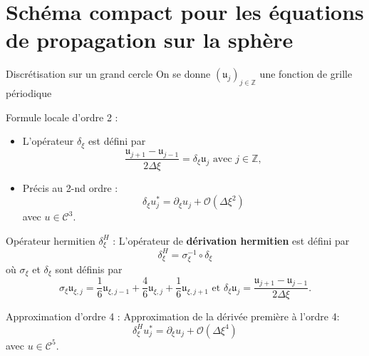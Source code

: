 \documentclass[11pt]{beamer}
\begin{document}
\section{Schéma compact pour les équations de propagation sur la sphère}
\begin{frame}{Discrétisation sur un grand cercle}
On se donne $(\mathfrak{u}_j)_{j\in \mathbb{Z}}$ une fonction de grille périodique
\begin{figure}[htbp]
\begin{center}
\end{center}
\end{figure}

\begin{block}{Formule locale d'ordre 2 :}
\begin{itemize}
\item L'opérateur $\delta_{\xi}$ est défini par
$$
\dfrac{\mathfrak{u}_{j+1}-\mathfrak{u}_{j-1}}{2 \Delta \xi} = \delta_{\xi} \mathfrak{u}_j \text{ avec } j \in \mathbb{Z},
$$
\item Précis au 2-nd ordre :
$$
\delta_{\xi} u^*_j = \partial_{\xi} u_j + \mathcal{O} \left( \Delta \xi^2 \right)
$$
avec $u \in \mathcal{C}^3$.
\end{itemize}
\end{block}
\end{frame}






\begin{frame}{}
\begin{block}{Opérateur hermitien $\delta_{\xi}^H$ :}
L'opérateur de \textbf{dérivation hermitien} est défini par
$$
\delta_{\xi}^H = \sigma_{\xi}^{-1} \circ \delta_{\xi}
$$
où $\sigma_{\xi}$ et $\delta_{\xi}$ sont définis par
$$
\sigma_{\xi} \mathfrak{u}_{\xi,j} = \dfrac{1}{6}\mathfrak{u}_{\xi,j-1} + \dfrac{4}{6}\mathfrak{u}_{\xi,j} + \dfrac{1}{6} \mathfrak{u}_{\xi,j+1} \text{ et } \delta_{\xi} \mathfrak{u}_j= \dfrac{\mathfrak{u}_{j+1}-\mathfrak{u}_{j-1}}{2 \Delta \xi}.
$$
\end{block}
\begin{block}{Approximation d'ordre 4 :}
Approximation de la dérivée première à l'ordre 4:
$$
\delta_{\xi}^H u^*_j = \partial_{\xi} u_j + \mathcal{O} \left( \Delta \xi^4 \right)
$$
avec $u \in \mathcal{C}^5$.
\end{block}
\end{frame}
\end{document}
